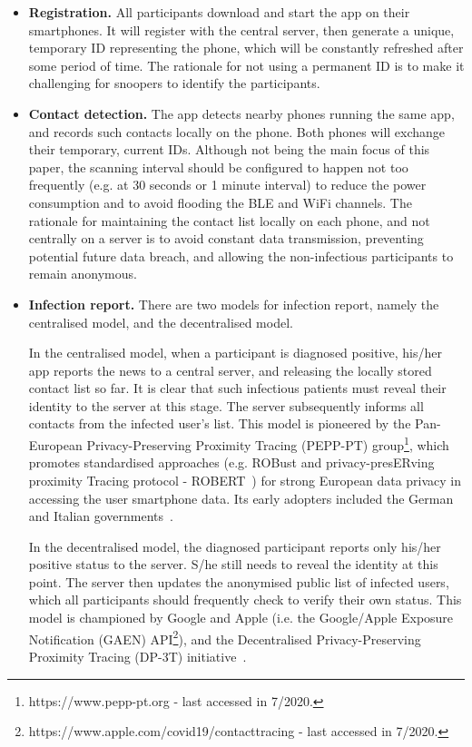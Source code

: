 \documentclass[graybox]{svmult}
\begin{document}
\begin{itemize}
    \item \textbf{Registration.} All participants download and start the app on their smartphones. It will register with the central server, then generate a unique, temporary ID representing the phone, which will be constantly refreshed after some period of time. The rationale for not using a permanent ID is to make it challenging for snoopers to identify the participants.
    
    \item \textbf{Contact detection.} The app detects nearby phones running the same app, and records such contacts locally on the phone. Both phones will exchange their temporary, current IDs. Although not being the main focus of this paper, the scanning interval should be configured to happen not too frequently (e.g. at 30 seconds or 1 minute interval) to reduce the power consumption and to avoid flooding the BLE and WiFi channels. The rationale for maintaining the contact list locally on each phone, and not centrally on a server is to avoid constant data transmission, preventing potential future data breach, and allowing the non-infectious participants to remain anonymous.
    
    \item \textbf{Infection report.} There are two models for infection report, namely the centralised model, and the decentralised model.
    
    In the centralised model, when a participant is diagnosed positive, his/her app reports the news to a central server, and releasing the locally stored contact list so far. It is clear that such infectious patients must reveal their identity to the server at this stage. The server subsequently informs all contacts from the infected user's list. This model is pioneered by the Pan-European Privacy-Preserving Proximity Tracing (PEPP-PT) group\footnote{https://www.pepp-pt.org - last accessed in 7/2020.}, which promotes standardised approaches (e.g. ROBust and privacy-presERving proximity Tracing protocol - ROBERT~\cite{castelluccia2020robert}) for strong European data privacy in accessing the user smartphone data. Its early adopters included the German and Italian governments~\cite{oxfordeuropean}.
    
    In the decentralised model, the diagnosed participant reports only his/her positive status to the server. S/he still needs to reveal the identity at this point. The server then updates the anonymised public list of infected users, which all participants should frequently check to verify their own status. This model is championed by Google and Apple (i.e. the Google/Apple Exposure Notification (GAEN) API\footnote{https://www.apple.com/covid19/contacttracing - last accessed in 7/2020.}), and the Decentralised Privacy-Preserving Proximity Tracing (DP-3T) initiative~\cite{hubaux2020decentralized}.
    

\end{itemize}
\end{document}

